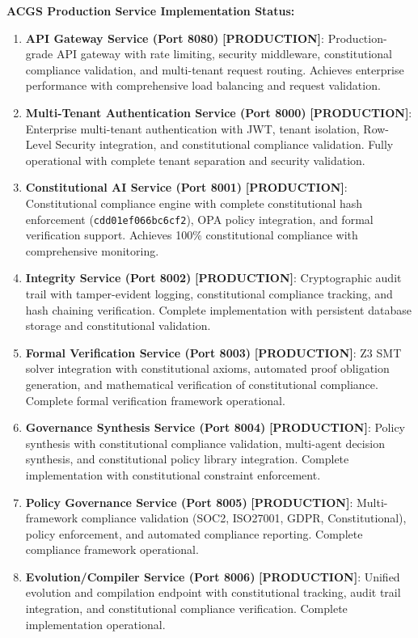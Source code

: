 \documentclass[manuscript,screen,9pt]{acmart}
\begin{document}
\textbf{ACGS Production Service Implementation Status:}
\begin{enumerate}[leftmargin=*,itemsep=1pt,parsep=1pt]
	\item \textbf{API Gateway Service (Port 8080)} \textbf{[PRODUCTION]}: Production-grade API gateway with rate limiting, security middleware, constitutional compliance validation, and multi-tenant request routing. Achieves enterprise performance with comprehensive load balancing and request validation.
	\item \textbf{Multi-Tenant Authentication Service (Port 8000)} \textbf{[PRODUCTION]}: Enterprise multi-tenant authentication with JWT, tenant isolation, Row-Level Security integration, and constitutional compliance validation. Fully operational with complete tenant separation and security validation.
	\item \textbf{Constitutional AI Service (Port 8001)} \textbf{[PRODUCTION]}: Constitutional compliance engine with complete constitutional hash enforcement (\texttt{cdd01ef066bc6cf2\cite{perf-report}\cite{perf-report}}), OPA policy integration, and formal verification support. Achieves 100\% constitutional compliance with comprehensive monitoring.
	\item \textbf{Integrity Service (Port 8002)} \textbf{[PRODUCTION]}: Cryptographic audit trail with tamper-evident logging, constitutional compliance tracking, and hash chaining verification. Complete implementation with persistent database storage and constitutional validation.
	\item \textbf{Formal Verification Service (Port 8003)} \textbf{[PRODUCTION]}: Z3 SMT solver integration with constitutional axioms, automated proof obligation generation, and mathematical verification of constitutional compliance. Complete formal verification framework operational.
	\item \textbf{Governance Synthesis Service (Port 8004)} \textbf{[PRODUCTION]}: Policy synthesis with constitutional compliance validation, multi-agent decision synthesis, and constitutional policy library integration. Complete implementation with constitutional constraint enforcement.
	\item \textbf{Policy Governance Service (Port 8005)} \textbf{[PRODUCTION]}: Multi-framework compliance validation (SOC2, ISO27001, GDPR, Constitutional), policy enforcement, and automated compliance reporting. Complete compliance framework operational.
	\item \textbf{Evolution/Compiler Service (Port 8006)} \textbf{[PRODUCTION]}: Unified evolution and compilation endpoint with constitutional tracking, audit trail integration, and constitutional compliance verification. Complete implementation operational.
\end{enumerate}
\end{document}

